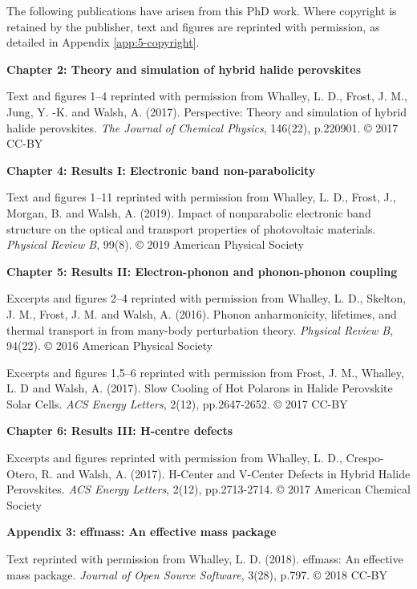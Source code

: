
The following publications have arisen from this PhD work. Where copyright is retained by the publisher, text and figures are reprinted with permission, as detailed in Appendix \ref{app:5-copyright}.

\vspace{\frontmatterbaselineskip}

\textbf{Chapter 2: Theory and simulation of hybrid halide perovskites } 

Text and figures 1--4 reprinted with permission from
Whalley, L. D., Frost, J. M., Jung, Y. -K. and Walsh, A. (2017). Perspective: Theory and simulation of hybrid halide perovskites. \textit{The Journal of Chemical Physics}, 146(22), p.220901. © 2017 CC-BY
\vspace{\frontmatterbaselineskip}

\textbf{Chapter 4: Results I: Electronic band non-parabolicity}

Text and figures 1--11 reprinted with permission from
Whalley, L. D., Frost, J., Morgan, B. and Walsh, A. (2019). Impact of nonparabolic electronic band structure on the optical and transport properties of photovoltaic materials. \textit{Physical Review B}, 99(8). © 2019 American Physical Society
\vspace{\frontmatterbaselineskip}

\textbf{Chapter 5: Results II: Electron-phonon and phonon-phonon coupling}

Excerpts and figures 2--4 reprinted with permission from
Whalley, L. D., Skelton, J. M., Frost, J. M. and Walsh, A. (2016). Phonon anharmonicity, lifetimes, and thermal transport in  from many-body perturbation theory. \textit{Physical Review B}, 94(22). © 2016 American Physical Society

Excerpts and figures 1,5--6 reprinted with permission from
Frost, J. M., Whalley, L. D and Walsh, A. (2017). Slow Cooling of Hot Polarons in Halide Perovskite Solar Cells. \textit{ACS Energy Letters}, 2(12), pp.2647-2652. © 2017 CC-BY
\vspace{\frontmatterbaselineskip}

\textbf{Chapter 6: Results III: H-centre defects}

Excerpts and figures reprinted with permission from
Whalley, L. D., Crespo-Otero, R. and Walsh, A. (2017). H-Center and V-Center Defects in Hybrid Halide Perovskites. \textit{ACS Energy Letters}, 2(12), pp.2713-2714. © 2017 American Chemical Society 

\textbf{Appendix 3: effmass: An effective mass package}

Text reprinted with permission from
Whalley, L. D. (2018). effmass: An effective mass package. \textit{Journal of Open Source Software}, 3(28), p.797. © 2018 CC-BY 


